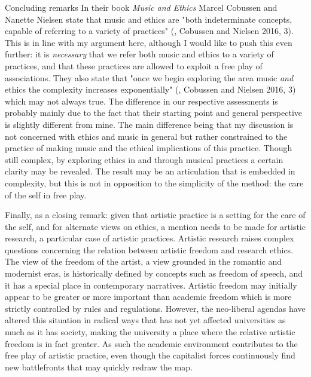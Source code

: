 \documentclass[presentation]{beamer}
\makeatletter
\newcommand{\cslcitation}[2]
 {\protect\hyper@linkstart{cite}{citeproc_bib_item_#1}#2\hyper@linkend}
\makeatother
\begin{document}
\begin{frame}[label={sec:org0a23741}]{Concluding remarks}
In their book \emph{Music and Ethics} Marcel Cobussen and Nanette Nielsen state that music and ethics are "both indeterminate concepts, capable of referring to a variety of practices" (, \cslcitation{4}{Cobussen and Nielsen 2016, 3}). This is in line with my argument here, although I would like to push this even further: it is \emph{necessary} that we refer both music and ethics to a variety of practices, and that these practices are allowed to exploit a free play of associations. They also state that "once we begin exploring the area music \emph{and} ethics the complexity increases exponentially" (, \cslcitation{4}{Cobussen and Nielsen 2016, 3}) which may not always true. The difference in our respective assessments is probably mainly due to the fact that their starting point and general perspective is slightly different from mine. The main difference being that my discussion is not concerned with ethics and music in general but rather constrained to the practice of making music and the ethical implications of this practice. Though still complex, by exploring ethics in and through musical practices a certain clarity may be revealed. The result may be an articulation that is embedded in complexity, but this is not in opposition to the simplicity of the method: the care of the self in free play.

Finally, as a closing remark: given that artistic practice is a setting for the care of the self, and for alternate views on ethics, a mention needs to be made for artistic research, a particular case of artistic practices. Artistic research raises complex questions concerning the relation between artistic freedom and research ethics. The view of the freedom of the artist, a view grounded in the romantic and modernist eras, is historically defined by concepts such as freedom of speech, and it has a special place in contemporary narratives. Artistic freedom may initially appear to be greater or more important than academic freedom which is more strictly controlled by rules and regulations. However, the neo-liberal agendas have altered this situation in radical ways that has not yet affected universities as much as it has society, making the university a place where the relative artistic freedom is in fact greater. As such the academic environment contributes to the free play of artistic practice, even though the capitalist forces continuously find new battlefronts that may quickly redraw the map.


\end{frame}
\end{document}
